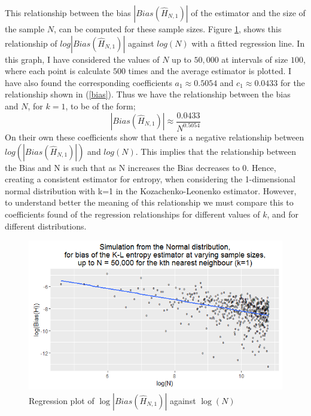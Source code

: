 \documentclass{article}
\begin{document}
This relationship between the bias $|Bias(\hat{H}_{N, 1})|$ of the estimator and the size of the sample $N$, can be computed for these sample sizes. Figure \ref{normal_k=1_graph}, shows this relationship of $log|Bias(\hat{H}_{N, 1})|$ against $log(N)$ with a fitted regression line. In this graph, I have considered the values of $N$ up to $50,000$ at intervals of size $100$, where each point is calculate $500$ times and the average estimator is plotted. I have also found the corresponding coefficients $a_{1} \approx 0.5054$ and $c_{1} \approx 0.0433$ for the relationship shown in (\ref{bias}). Thus we have the relationship between the bias and $N$, for $k=1$, to be of the form;
\begin{equation}
|Bias(\hat{H}_{N, 1})| \approx \frac{0.0433}{N^{0.5054}} \nonumber
\end{equation}
On their own these coefficients show that there is a negative relationship between $log(|Bias(\hat{H}_{N, 1})|)$ and $log(N)$. This implies that the relationship between the Bias and N is such that as N increases the Bias decreases to 0. Hence, creating a consistent estimator for entropy, when considering the 1-dimensional normal distribution with k=1 in the Kozachenko-Leonenko estimator. However, to understand better the meaning of this relationship we must compare this to coefficients found of the regression relationships for different values of $k$, and for different distributions.

\begin{figure}
  \begin{center}
    \includegraphics[width=\textwidth]{./Graphs/new_normal_k=1.png}
  \end{center}
\caption{Regression plot of $\log|Bias(\hat{H}_{N, 1})|$ against $\log(N)$}
  \label{normal_k=1_graph}
\end{figure}
\end{document}
